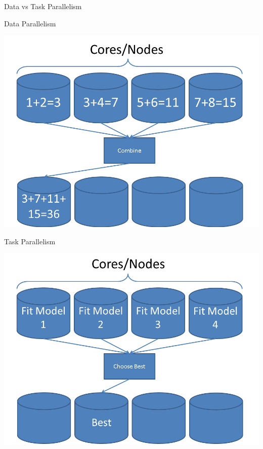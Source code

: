 \begin{frame}
  \begin{block}{Data vs Task Parallelism}\pause
    \begin{center}
    \begin{minipage}{.46\textwidth}
    \begin{block}{\centering Data Parallelism}
      \begin{center}
      \includegraphics[width=.975\textwidth]{pics/parallelism_data}
      \end{center}
      \end{block}
    \end{minipage}
    \hspace{.15cm}
    \begin{minipage}{.46\textwidth}
    \begin{block}{\centering Task Parallelism}
      \begin{center}
      \includegraphics[width=.975\textwidth]{pics/parallelism_task}
      \end{center}
      \end{block}
    \end{minipage}
    \end{center}
  \end{block}
\end{frame}




